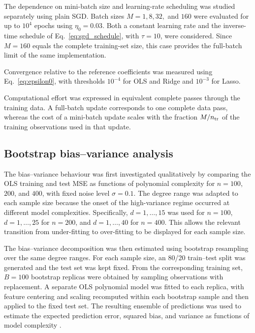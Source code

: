 \documentclass[aps,rmp,reprint,amsmath,amssymb,graphicx,longbibliography]{revtex4-1}
\begin{document}
The dependence on mini-batch size and learning-rate scheduling was studied
separately using plain SGD. Batch sizes $M=1,8,32,$ and $160$ were evaluated
for up to $10^4$ epochs using $\eta_0=0.03$. Both a constant learning rate
and the inverse-time schedule of Eq.~\eqref{eq:sgd_schedule}, with
$\tau=10$, were considered. Since $M=160$ equals the complete training-set
size, this case provides the full-batch limit of the same implementation.

Convergence relative to the reference coefficients was measured using
Eq.~\eqref{eq:epsilon0}, with thresholds $10^{-4}$ for OLS and Ridge and
$10^{-3}$ for Lasso. 

Computational effort was expressed in equivalent complete passes through the
training data. A full-batch update corresponds to one complete data pass,
whereas the cost of a mini-batch update scales with the fraction $M/n_{\rm tr}$
of the training observations used in that update.

\subsection{Bootstrap bias--variance analysis}
\label{sec:bootstrap}

The bias--variance behaviour was first investigated qualitatively by comparing
the OLS training and test MSE as functions of polynomial complexity for
$n=100$, $200$, and $400$, with fixed noise level $\sigma=0.1$. The degree
range was adapted to each sample size because the onset of the high-variance
regime occurred at different model complexities. Specifically,
$d=1,\ldots,15$ was used for $n=100$, $d=1,\ldots,25$ for $n=200$, and
$d=1,\ldots,40$ for $n=400$. This allows the relevant transition from
under-fitting to over-fitting to be displayed for each sample size.

The bias--variance decomposition was then estimated using bootstrap resampling
over the same degree ranges. For each sample size, an 80/20 train--test split
was generated and the test set was kept fixed. From the corresponding training
set, $B=100$ bootstrap replicas were obtained by sampling observations with
replacement. A separate OLS polynomial model was fitted to each replica, with
feature centering and scaling recomputed within each bootstrap sample and then
applied to the fixed test set. The resulting ensemble of predictions was used
to estimate the expected prediction error, squared bias, and variance as
functions of model complexity \cite{HjorthJensen2026MLPSCh2}.
\end{document}
